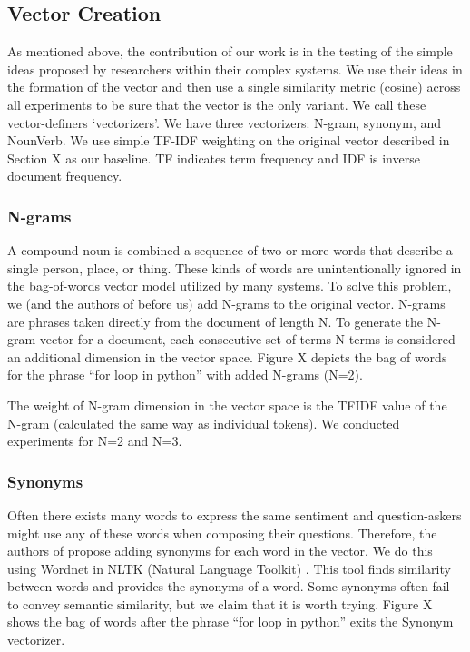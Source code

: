 \documentclass{acm_proc_article-sp}
\begin{document}
\subsection{Vector Creation}
As mentioned above, the contribution of our work is in the testing of the simple ideas proposed by researchers within their complex systems. We use their ideas in the formation of the vector and then use a single similarity metric (cosine) across all experiments to be sure that the vector is the only variant. We call these vector-definers `vectorizers’. We have three vectorizers: N-gram, synonym, and NounVerb. We use simple TF-IDF weighting on the original vector described in Section X as our baseline. TF indicates term frequency and IDF is inverse document frequency. 

\subsubsection{N-grams}
A compound noun is combined a sequence of two or more words that describe a single person, place, or thing. These kinds of words are unintentionally ignored in the bag-of-words vector model utilized by many systems. To solve this problem, we (and the authors of \cite{millar2006performance} before us) add N-grams to the original vector. N-grams are phrases taken directly from the document of length N.  To generate the N-gram vector for a document, each consecutive set of terms N terms is considered an additional dimension in the vector space. Figure X depicts the bag of words for the phrase ``for loop in python” with added N-grams (N=2).

The weight of N-gram dimension in the vector space is the TFIDF value of the N-gram (calculated the same way as individual tokens). We conducted experiments for N=2 and N=3. 

\subsubsection{Synonyms}
Often there exists many words to express the same sentiment and question-askers might use any of these words when composing their questions. Therefore, the authors of \cite{liu2009searching} propose adding synonyms for each word in the vector. We do this using Wordnet in NLTK (Natural Language Toolkit) \cite{bird2009natural}. This tool finds similarity between words and provides the synonyms of a word. Some synonyms often fail to convey semantic similarity, but we claim that it is worth trying. Figure X shows the bag of words after the phrase ``for loop in python” exits the Synonym vectorizer. 
\end{document}
